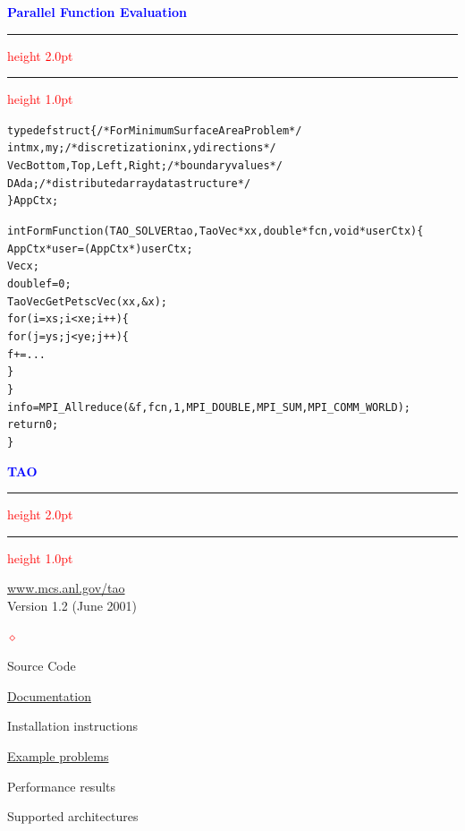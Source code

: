 \documentclass{seminar}
\newcommand{\reddiamond}{\textcolor{red}{$\diamond$}}
\newcommand{\redstripe}{\textcolor{red}{\hrule height 2.0pt\hfil}
             \vspace{-1.8pt}
             \textcolor{red}{\hrule height 1.0pt\hfil}
}
\newcommand{\heading}[1]{%
   \centerline{\textcolor{blue}{\textbf{#1}}}%
    \redstripe%
    \bigskip
}
\begin{document}
\begin{slide}

\heading{Parallel Function Evaluation}

\begin{alltt}
\scriptsize \setlength{\baselineskip}{8pt}
   typedef struct \{                    /* For Minimum Surface Area Problem */
     int         mx, my;              /* discretization in x, y directions */
     Vec         Bottom, Top, Left, Right;              /* boundary values */
     DA          da;                   /* distributed array data structure */
   \} AppCtx;

   int FormFunction(TAO_SOLVER tao, TaoVec *xx, double* fcn,void *userCtx)\{
      AppCtx *user = (AppCtx *)userCtx;
      Vec x;
      double f=0;
      TaoVecGetPetscVec(xx,&x);
      for (i=xs; i<xe; i++)\{
        for (j=ys; j<ye; j++)\{
           f += ...
        \}
      \}
      info = MPI_Allreduce(&f,fcn,1,MPI_DOUBLE,MPI_SUM,MPI_COMM_WORLD);
      return 0;
   \}
\end{alltt}

\vfill

\end{slide}

\begin{slide}

\heading{TAO}

\begin{center}
\href{http://www.mcs.anl.gov/tao}{www.mcs.anl.gov/tao} \\
Version 1.2 (June 2001)
\end{center}


\begin{list}{\reddiamond}{}
\item
Source Code
\item
\href{http://www.mcs.anl.gov/tao/docs}
{Documentation}
\item
Installation instructions
\item
\href{http://www-unix.mcs.anl.gov/tao/src/bound/examples/exercises/main.htm}%
{Example problems}
\item
Performance results
\item
Supported architectures
\end{list}

\vfill

\end{slide}
\end{document}
